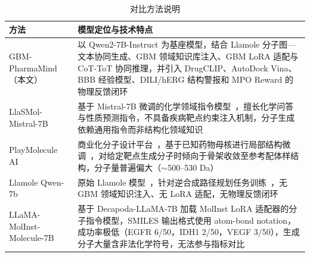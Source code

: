 \begin{table}[htbp]
    \centering
    \caption{对比方法说明}\label{tab:comparison-methods}
    \begin{tabular}{lp{12cm}}
        \toprule
        \textbf{方法} & \textbf{模型定位与技术特点} \\
        \midrule
        GBM-PharmaMind（本文） & 以 Qwen2-7B-Instruct 为基座模型，结合 Llamole 分子图—文本协同生成、GBM 领域知识库注入、GBM LoRA 适配与 CoT-ToT 协同推理，并引入 DrugCLIP、AutoDock Vina、BBB 经验模型、DILI/hERG 结构警报和 MPO Reward 的物理反馈闭环 \\
        LlaSMol-Mistral-7B~\cite{Yu2024} & 基于 Mistral-7B 微调的化学领域指令模型~\cite{Yu2024}，擅长化学问答与性质预测指令，不具备疾病靶点约束注入机制，分子生成依赖通用指令而非结构化领域知识 \\
        PlayMolecule AI~\cite{rusinko2024aiddison} & 商业化分子设计平台~\cite{rusinko2024aiddison}，基于已知药物母核进行局部结构微调~\cite{torrensfontanals2024playmolecule}，对给定靶点生成分子时倾向于骨架收敛至参考配体样结构，分子量普遍偏大（$\sim$500--530 Da） \\
        Llamole Qwen-7b~\cite{liu2025multimodal} & 原始 Llamole 模型~\cite{liu2025multimodal}，针对逆合成路径规划任务训练~\cite{liu2025multimodal}，无 GBM 领域知识注入、无 LoRA 适配，无物理反馈闭环 \\
        LLaMA-MolInst-Molecule-7B & 基于 Decapoda-LLaMA-7B 加载 MolInst LoRA 适配器的分子指令模型，SMILES 输出格式使用 atom-bond notation，成功率极低（EGFR 6/50，IDH1 2/50，VEGF 3/50），生成分子大量含非法化学符号，无法参与指标对比 \\
        \bottomrule
    \end{tabular}
\end{table}

